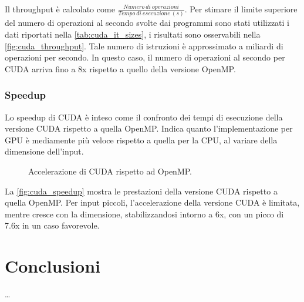 \documentclass[12pt,a4paper]{report}
\begin{document}
Il throughput è calcolato come \(\frac{Numero\ di\ operazioni}{Tempo\ di\ esecuzione\ (s)}\).
Per stimare il limite superiore del numero di operazioni al secondo svolte dai programmi sono stati utilizzati i dati riportati
nella \autoref{tab:cuda_it_sizes}, i risultati sono osservabili nella \autoref{fig:cuda_throughput}.
Tale numero di istruzioni è approssimato a miliardi di operazioni per secondo.
In questo caso, il numero di operazioni al secondo per CUDA arriva fino a 8x rispetto a quello della versione OpenMP.

\subsection{Speedup}

Lo speedup di CUDA è inteso come il confronto dei tempi di esecuzione della versione CUDA rispetto a quella OpenMP.
Indica quanto l'implementazione per GPU è mediamente più veloce rispetto a quella per la CPU, al variare della dimensione
dell'input.

\begin{figure}[H]
  \centering
    \caption{\label{fig:cuda_speedup} Accelerazione di CUDA rispetto ad OpenMP.}
\end{figure}

La \autoref{fig:cuda_speedup} mostra le prestazioni della versione CUDA rispetto a quella OpenMP.
Per input piccoli, l'accelerazione della versione CUDA è limitata, mentre cresce con la dimensione, stabilizzandosi intorno a 6x,
con un picco di 7.6x in un caso favorevole.

\appendix

\chapter{Conclusioni}

\dots

\label{mylastpage}
\printbibliography %
\thispagestyle{empty} %
\pagestyle{empty} %
\end{document}
